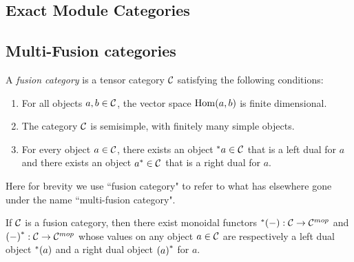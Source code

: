 \documentclass{amsart}
\begin{document}


\subsection{Exact Module Categories}




\subsection{Multi-Fusion categories} \label{sec-tc-fusion}


\begin{definition}
A \emph{fusion category} is a tensor category $\mathcal C$ satisfying the following conditions:
\begin{enumerate}
\item For all objects $a, b \in \mathcal C$, the vector space $\operatorname{Hom}(a,b)$ is finite dimensional.
\item The category $\mathcal C$ is semisimple, with finitely many simple objects.
\item For every object $a \in \mathcal C$, there exists an object ${}^*{a} \in \mathcal C$ that is a left dual for $a$ and there exists an object ${a}^* \in \mathcal C$ that is a right dual for $a$.
\end{enumerate}
\end{definition}

\begin{remark}
Here for brevity we use ``fusion category" to refer to what has elsewhere gone under the name ``multi-fusion category".
\end{remark}

\begin{proposition}
If $\mathcal C$ is a fusion category, then there exist monoidal functors ${}^*{(-)} : \mathcal C \rightarrow \mathcal C^{{mop}}$ and ${(-)}^* : \mathcal C \rightarrow \mathcal C^{{mop}}$ whose values on any object $a \in \mathcal C$ are respectively a left dual object ${}^*{(a)}$ and a right dual object ${(a)}^*$ for $a$.
\end{proposition}
\end{document}
